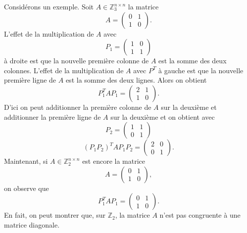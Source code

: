Considérons un exemple. Soit $A ∈ ℤ_3^{ n × n}$ la matrice  
\begin{displaymath}
  A =
  \begin{pmatrix}
    0 & 1 \\
    1 & 0 
  \end{pmatrix}.
\end{displaymath}
L'effet de la multiplication de $A$ avec
\begin{displaymath}
  P_1 =  \begin{pmatrix}
    1 & 0\\
    1 & 1 
  \end{pmatrix} 
\end{displaymath}
à droite est que la nouvelle première colonne de $A$ est la somme des deux colonnes. L'effet de la multiplication de $A$ avec $P^T$ à gauche est que la nouvelle première ligne de $A$ est la somme des deux lignes. Alors on obtient
\begin{displaymath}
  P_1^T A  P_1 =
  \begin{pmatrix}
    2 & 1 \\
    1 & 0 
  \end{pmatrix}.
\end{displaymath}
D'ici on peut additionner la première colonne de $A$ sur la deuxième et additionner la  première ligne de $A$ sur la deuxième et on obtient avec 
\begin{displaymath}
  P_2 =  \begin{pmatrix}
    1 & 1\\
    0 & 1 
  \end{pmatrix} 
\end{displaymath}
\begin{displaymath}
  (P_1 P_2)^T A P_1P_2 =  \begin{pmatrix}
    2 & 0 \\
    0 & 1 
  \end{pmatrix}.
\end{displaymath}
%
Maintenant, si  $A ∈ ℤ_2^{ n × n}$  est encore la  matrice  
\begin{displaymath}
  A =
  \begin{pmatrix}
    0 & 1 \\
    1 & 0 
  \end{pmatrix}, 
\end{displaymath}
on observe que 
\begin{displaymath}
  P_1^T A  P_1 =
  \begin{pmatrix}
    0 & 1 \\
    1 & 0 
  \end{pmatrix}.
\end{displaymath}
En fait, on peut montrer que, sur $ℤ_2$, la matrice $A$ n'est pas congruente à une matrice diagonale.

